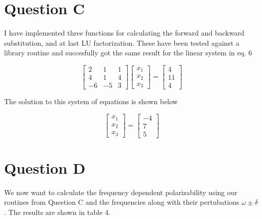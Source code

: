 \documentclass[a4paper,12pkt]{report}
\begin{document}
\newpage

\section*{Question C}

I have implemented three functions for calculating the forward and backward substitution, and at last LU factorization. These have been tested against a library routine and succesfully got the same result for the linear system in eq. 6


\begin{equation}
    \begin{bmatrix}
        2 & 1 & 1\\
        4 & 1 & 4 \\
        -6 & -5 & 3
    \end{bmatrix}
    \begin{bmatrix}
        x_1  \\
        x_2 \\
        x_3
    \end{bmatrix}
    =\begin{bmatrix}
        4 \\
        11 \\
        4
    \end{bmatrix}
\end{equation}

The solution to this system of equations is shown below

\begin{equation}
    \begin{bmatrix}
        x_1 \\
        x_2 \\
        x_3 
    \end{bmatrix} = 
    \begin{bmatrix}
        -4 \\
        7 \\
        5 
    \end{bmatrix}
\end{equation}

\section*{Question D}

We now want to calculate the frequency dependent polarizability using our routines from Question C and the frequencies along with their pertubations $\omega \pm \delta$. The results are shown in table 4.
\end{document}
